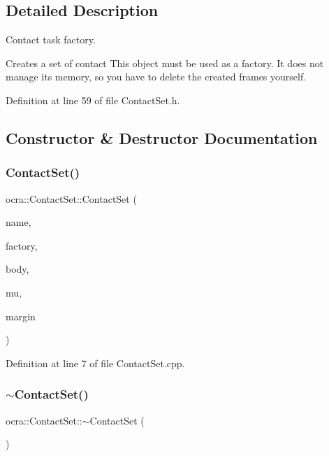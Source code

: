 \subsection{Detailed Description}
Contact task factory. 

Creates a set of contact This object must be used as a factory. It does not manage its memory, so you have to delete the created frames yourself. 

Definition at line 59 of file Contact\+Set.\+h.



\subsection{Constructor \& Destructor Documentation}
\hypertarget{classocra_1_1ContactSet_aa1bc409bbd509f1b56ab6de851102435}{}\label{classocra_1_1ContactSet_aa1bc409bbd509f1b56ab6de851102435} 
\subsubsection{\texorpdfstring{Contact\+Set()}{ContactSet()}}
{\footnotesize\ttfamily ocra\+::\+Contact\+Set\+::\+Contact\+Set (\begin{DoxyParamCaption}\item[{const std\+::string \&}]{name,  }\item[{const \hyperlink{classocra_1_1Controller}{Controller} \&}]{factory,  }\item[{Segment\+Frame\+::\+Ptr}]{body,  }\item[{double}]{mu,  }\item[{double}]{margin }\end{DoxyParamCaption})}



Definition at line 7 of file Contact\+Set.\+cpp.

\hypertarget{classocra_1_1ContactSet_ad41eb11994dbd12c9fc55997428e256f}{}\label{classocra_1_1ContactSet_ad41eb11994dbd12c9fc55997428e256f} 
\subsubsection{\texorpdfstring{$\sim$\+Contact\+Set()}{~ContactSet()}}
{\footnotesize\ttfamily ocra\+::\+Contact\+Set\+::$\sim$\+Contact\+Set (\begin{DoxyParamCaption}{ }\end{DoxyParamCaption})\hspace{0.3cm}{\ttfamily [virtual]}}



